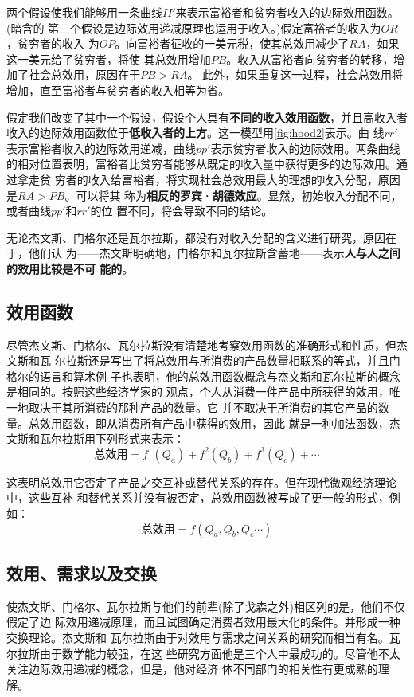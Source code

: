 两个假设使我们能够用一条曲线$II'$来表示富裕者和贫穷者收入的边际效用函数。(暗含的
第三个假设是边际效用递减原理也运用于收入。)假定富裕者的收入为$OR$，贫穷者的收入
为$OP$。向富裕者征收的一美元税，使其总效用减少了$RA$，如果这一美元给了贫穷者，将使
其总效用增加$PB$。收入从富裕者向贫穷者的转移，增加了社会总效用，原因在于$PB>RA$。
此外，如果重复这一过程，社会总效用将增加，直至富裕者与贫穷者的收入相等为省。

假定我们改变了其中一个假设，假设个人具有\textbf{不同的收入效用函数}，并且高收入者
收入的边际效用函数位于\textbf{低收入者的上方}。这一模型用\cref{fig:hood2}表示。曲
线$rr'$表示富裕者收入的边际效用递减，曲线$pp'$表示贫穷者收入的边际效用。两条曲线
的相对位置表明，富裕者比贫穷者能够从既定的收入量中获得更多的边际效用。通过拿走贫
穷者的收入给富裕者，将实现社会总效用最大的理想的收入分配，原因是$RA>PB$。可以将其
称为\textbf{相反的罗宾·胡德效应}。显然，初始收入分配不同，或者曲线$pp'和rr'$的位
置不同，将会导致不同的结论。

无论杰文斯、门格尔还是瓦尔拉斯，都没有对收入分配的含义进行研究，原因在于，他们认
为——杰文斯明确地，门格尔和瓦尔拉斯含蓄地——表示\textbf{人与人之间的效用比较是不可
  能的}。

\subsection{效用函数}

尽管杰文斯、门格尔、瓦尔拉斯没有清楚地考察效用函数的准确形式和性质，但杰文斯和瓦
尔拉斯还是写出了将总效用与所消费的产品数量相联系的等式，并且门格尔的语言和算术例
子也表明，他的总效用函数概念与杰文斯和瓦尔拉斯的概念是相同的。按照这些经济学家的
观点，个人从消费一件产品中所获得的效用，唯一地取决于其所消费的那种产品的数量。它
并不取决于所消费的其它产品的数量。总效用函数，即从消费所有产品中获得的效用，因此
就是一种加法函数，杰文斯和瓦尔拉斯用下列形式来表示：
\[总效用=f^1(Q_a)+f^2(Q_b)+f^3(Q_c)+ \cdots\]

这表明总效用它否定了产品之交互补或替代关系的存在。但在现代微观经济理论中，这些互补
和替代关系并没有被否定，总效用函数被写成了更一般的形式，例如：
\[总效用=f(Q_a,Q_b,Q_c\cdots)\]

\subsection{效用、需求以及交换}

使杰文斯、门格尔、瓦尔拉斯与他们的前辈(除了戈森之外)相区列的是，他们不仅假定了边
际效用递减原理，而且试图确定消费者效用最大化的条件。并形成一种交换理论。杰文斯和
瓦尔拉斯由于对效用与需求之间关系的研究而相当有名。瓦尔拉斯由于数学能力较强，在这
些研究方面他是三个人中最成功的。尽管他不太关注边际效用递减的概念，但是，他对经济
体不同部门的相关性有更成熟的理解。

